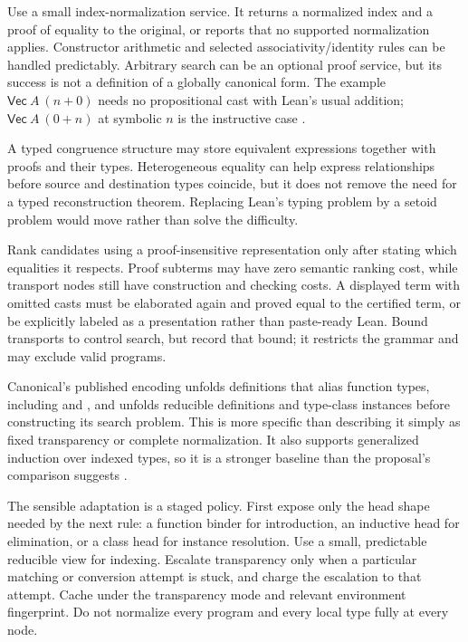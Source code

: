 Use a small index-normalization service. It returns a normalized index and a
proof of equality to the original, or reports that no supported normalization
applies. Constructor arithmetic and selected associativity/identity rules can
be handled predictably. Arbitrary  search can be an optional proof
service, but its success is not a definition of a globally canonical form.
The example $\mathsf{Vec}\ A\ (n+0)$ needs no propositional cast with Lean's
usual addition; $\mathsf{Vec}\ A\ (0+n)$ at symbolic $n$ is the instructive
case \cite{leanprelude}.

A typed congruence structure may store equivalent expressions together with
proofs and their types. Heterogeneous equality can help express relationships
before source and destination types coincide, but it does not remove the need
for a typed reconstruction theorem. Replacing Lean's typing problem by a
setoid problem would move rather than solve the difficulty.

Rank candidates using a proof-insensitive representation only after stating
which equalities it respects. Proof subterms may have zero semantic ranking
cost, while transport nodes still have construction and checking costs.
A displayed term with omitted casts must be elaborated again and proved equal
to the certified term, or be explicitly labeled as a presentation rather than
paste-ready Lean. Bound transports to control search, but record that bound;
it restricts the grammar and may exclude valid programs.


Canonical's published encoding unfolds definitions that alias function types,
including  and , and unfolds reducible definitions and
type-class instances before constructing its search problem. This is more
specific than describing it simply as fixed transparency or complete
normalization. It also supports generalized induction over indexed types,
so it is a stronger baseline than the proposal's comparison suggests
\cite{canonical}.

The sensible adaptation is a staged policy. First expose only the head shape
needed by the next rule: a function binder for introduction, an inductive head
for elimination, or a class head for instance resolution. Use a small,
predictable reducible view for indexing. Escalate transparency only when a
particular matching or conversion attempt is stuck, and charge the escalation
to that attempt. Cache under the transparency mode and relevant environment
fingerprint. Do not normalize every program and every local type fully at
every node.

